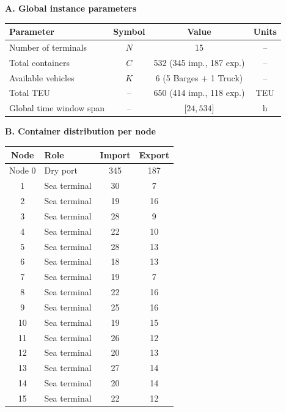 \begin{table}[htbp]
\centering

\textbf{A. Global instance parameters}

\vspace{0.3em}

\begin{tabular}{l c c c}
\hline
Parameter & Symbol & Value & Units \\
\hline
Number of terminals & $N$ & 15 & -- \\
Total containers & $C$ & 532 (345 imp., 187 exp.) & -- \\
Available vehicles & $K$ & 6 (5 Barges + 1 Truck) & -- \\
Total TEU & -- & 650 (414 imp., 118 exp.) & TEU \\
Global time window span & -- & [$24, 534$] & h \\
\hline
\end{tabular}

\vspace{0.8em}

\textbf{B. Container distribution per node}

\vspace{0.3em}

\begin{tabular}{c l c c}
\hline
Node & Role & Import & Export \\
\hline
Node 0 & Dry port & 345 & 187 \\
1 & Sea terminal & 30 & 7 \\
2 & Sea terminal & 19 & 16 \\
3 & Sea terminal & 28 & 9 \\
4 & Sea terminal & 22 & 10 \\
5 & Sea terminal & 28 & 13 \\
6 & Sea terminal & 18 & 13 \\
7 & Sea terminal & 19 & 7 \\
8 & Sea terminal & 22 & 16 \\
9 & Sea terminal & 25 & 16 \\
10 & Sea terminal & 19 & 15 \\
11 & Sea terminal & 26 & 12 \\
12 & Sea terminal & 20 & 13 \\
13 & Sea terminal & 27 & 14 \\
14 & Sea terminal & 20 & 14 \\
15 & Sea terminal & 22 & 12 \\
\hline
\end{tabular}

\end{table}
